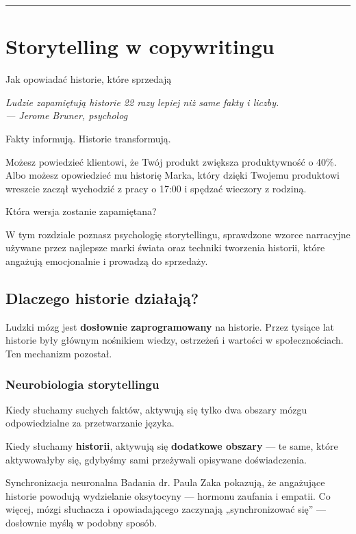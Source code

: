 \documentclass[
  12pt,
  a4paper,
  twoside,
  openright,
  12pt,
  DIV=12,
  BCOR=12mm]{scrbook}
\newcommand{\chapteropener}[1]{%
  \begin{center}
    \large\itshape\color{textmuted}#1
  \end{center}
  \vspace{1em}
}
\newcommand{\decoline}{%
  \begin{center}
    \textcolor{bordergray}{\rule{0.3\textwidth}{0.5pt}}
  \end{center}
}
\begin{document}
\decoline


\chapter{Storytelling w copywritingu}\label{storytelling-w-copywritingu}

Jak opowiadać historie, które sprzedają

\hfill\break

\chapteropener{Ludzie zapamiętują historie 22 razy lepiej niż same fakty i liczby.\\--- Jerome Bruner, psycholog}

Fakty informują. Historie transformują.

Możesz powiedzieć klientowi, że Twój produkt zwiększa produktywność o
40\%. Albo możesz opowiedzieć mu historię Marka, który dzięki Twojemu
produktowi wreszcie zaczął wychodzić z pracy o 17:00 i spędzać wieczory
z rodziną.

Która wersja zostanie zapamiętana?

W tym rozdziale poznasz psychologię storytellingu, sprawdzone wzorce
narracyjne używane przez najlepsze marki świata oraz techniki tworzenia
historii, które angażują emocjonalnie i prowadzą do sprzedaży.

\section{Dlaczego historie
działają?}\label{dlaczego-historie-dziaux142ajux105}

Ludzki mózg jest \textbf{dosłownie zaprogramowany} na historie. Przez
tysiące lat historie były głównym nośnikiem wiedzy, ostrzeżeń i wartości
w społecznościach. Ten mechanizm pozostał.

\subsection{Neurobiologia
storytellingu}\label{neurobiologia-storytellingu}

Kiedy słuchamy suchych faktów, aktywują się tylko dwa obszary mózgu
odpowiedzialne za przetwarzanie języka.

Kiedy słuchamy \textbf{historii}, aktywują się \textbf{dodatkowe
obszary} --- te same, które aktywowałyby się, gdybyśmy sami przeżywali
opisywane doświadczenia.

\begin{pojecie}{Synchronizacja neuronalna}
Badania dr. Paula Zaka pokazują, że angażujące historie powodują wydzielanie oksytocyny --- hormonu zaufania i empatii. Co więcej, mózgi słuchacza i opowiadającego zaczynają „synchronizować się” --- dosłownie myślą w podobny sposób.
\end{pojecie}
\end{document}
